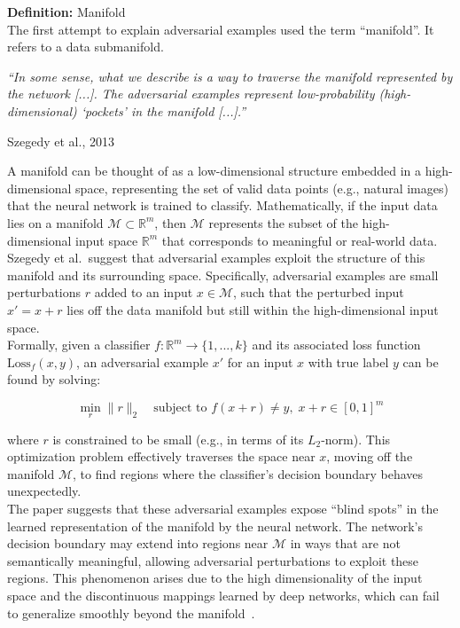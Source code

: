 \documentclass[a4paper, oneside]{discothesis}
\begin{document}
\begin{highlightbox}
	\textbf{Definition:} Manifold \\
	
	The first attempt to explain adversarial examples used the term ``manifold''. It refers to a data submanifold.
	
	\begin{flushright}
		\textit{``In some sense, what we describe is a way to traverse the manifold represented by the network [...]. The adversarial examples represent low-probability (high-dimensional) `pockets' in the manifold [...].''}
		
		\textemdash{} Szegedy et al., 2013~\cite{szegedy2013intriguing}
	\end{flushright}	
	
	A manifold can be thought of as a low-dimensional structure embedded in a high-dimensional space, representing the set of valid data points (e.g., natural images) that the neural network is trained to classify. Mathematically, if the input data lies on a manifold $\mathcal{M} \subset \mathbb{R}^m$, then $\mathcal{M}$ represents the subset of the high-dimensional input space $\mathbb{R}^m$ that corresponds to meaningful or real-world data. \\

	Szegedy et al.\ suggest that adversarial examples exploit the structure of this manifold and its surrounding space. Specifically, adversarial examples are small perturbations $r$ added to an input $x \in \mathcal{M}$, such that the perturbed input $x' = x + r$ lies off the data manifold but still within the high-dimensional input space. \\
	
	Formally, given a classifier $f: \mathbb{R}^m \to \{1, ..., k\}$ and its associated loss function $\text{Loss}_f(x, y)$, an adversarial example $x'$ for an input $x$ with true label $y$ can be found by solving:
	
	$$\min_{r} \|r\|_2 \quad \text{subject to } f(x + r) \neq y, \; x + r \in [0, 1]^m$$
	
	where $r$ is constrained to be small (e.g., in terms of its $L_2$-norm). This optimization problem effectively traverses the space near $x$, moving off the manifold $\mathcal{M}$, to find regions where the classifier's decision boundary behaves unexpectedly. \\
	
	The paper suggests that these adversarial examples expose ``blind spots'' in the learned representation of the manifold by the neural network. The network's decision boundary may extend into regions near $\mathcal{M}$ in ways that are not semantically meaningful, allowing adversarial perturbations to exploit these regions. This phenomenon arises due to the high dimensionality of the input space and the discontinuous mappings learned by deep networks, which can fail to generalize smoothly beyond the manifold~\cite{khoury2018geometry, Jha2018DetectingAE, Sha2020ADA, dube2018high, shamir2021dimpled}. \\
	

\end{highlightbox}
\end{document}
